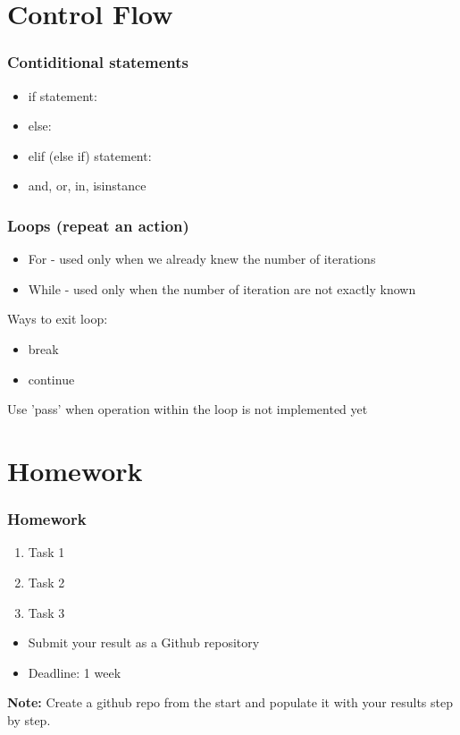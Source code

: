 \documentclass{beamer}
\begin{document}
\section{Control Flow} 

\begin{frame}
    \frametitle{Contiditional statements}
    \begin{itemize}
        \item if statement:
        \item else:
        \item elif (else if) statement:  
        \item and, or, in, isinstance
    \end{itemize}
\end{frame}

\begin{frame}
    \frametitle{Loops (repeat an action)}
    \begin{itemize}
        \item For - used only when we already knew the number of iterations
        \item While - used only when the number of iteration are not exactly known
    \end{itemize}

    Ways to exit loop:
    \begin{itemize}
        \item break
        \item continue
    \end{itemize}
    
    Use 'pass' when operation within the loop is not implemented yet
\end{frame}

\section{Homework} 

\begin{frame}
    \frametitle{Homework}
    \begin{enumerate}
        \item Task 1
        \item Task 2
        \item Task 3
    \end{enumerate}

    \vskip 2mm
    \begin{itemize}
        \item Submit your result as a Github repository
        \item Deadline: 1 week %
    \end{itemize}

\vfill
\textbf{Note:} Create a github repo from the start and populate it with your results step by step.
\end{frame}
\end{document}
